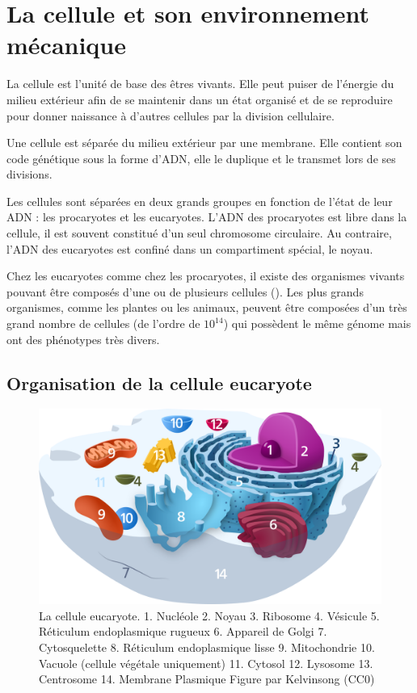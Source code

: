 %
%
%
%
%
\chapter{La cellule et son environnement mécanique}


La cellule est l'unité de base des êtres vivants. Elle peut puiser de l'énergie du milieu extérieur afin de se maintenir dans un état organisé et de se reproduire pour donner naissance à d'autres cellules par la division cellulaire. 

Une cellule est séparée du milieu extérieur par une membrane. Elle contient son code génétique sous la forme d'ADN, elle le duplique et le transmet lors de ses divisions. 

Les cellules sont séparées en deux grands groupes en fonction de l'état de leur ADN : les procaryotes et les eucaryotes. 
L'ADN des procaryotes est libre dans la cellule, il est souvent constitué d'un seul chromosome circulaire. 
Au contraire, l'ADN des eucaryotes est confiné dans un compartiment spécial, le noyau. 

Chez les eucaryotes comme chez les procaryotes, il existe des organismes vivants pouvant être composés d'une ou de plusieurs cellules (\cite{grosberg_evolution_2007}).
Les plus grands organismes, comme les plantes ou les animaux, peuvent être composées d'un très grand nombre de cellules (de l'ordre de $10^{14}$) qui possèdent le même génome mais ont des phénotypes très divers. 

\section{Organisation de la cellule eucaryote}
\begin{figure}[h!]
\includegraphics[scale=0.2]{Animal_Cell.png}
\caption{La cellule eucaryote. 
1. Nucléole
2. Noyau
3. Ribosome
4. Vésicule
5. Réticulum endoplasmique rugueux
6. Appareil de Golgi
7. Cytosquelette
8. Réticulum endoplasmique lisse
9. Mitochondrie
10. Vacuole (cellule végétale uniquement)
11. Cytosol
12. Lysosome
13. Centrosome
14. Membrane Plasmique
Figure par Kelvinsong (CC0)}
\end{figure}


